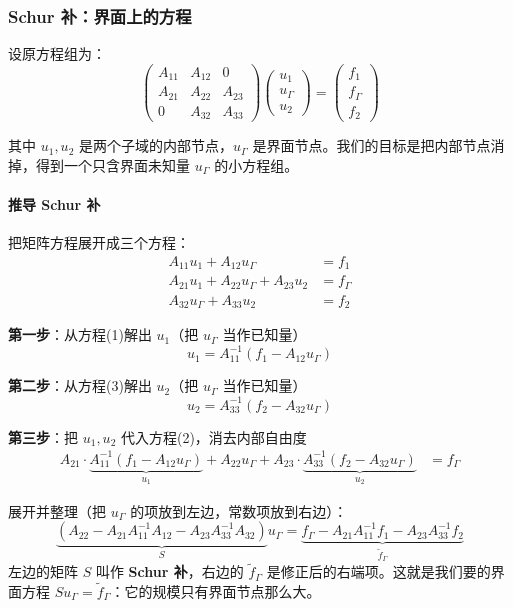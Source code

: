 \subsubsection*{Schur 补：界面上的方程}

设原方程组为：
\[
\begin{pmatrix}
A_{11} & A_{12} & 0 \\
A_{21} & A_{22} & A_{23} \\
0 & A_{32} & A_{33}
\end{pmatrix}
\begin{pmatrix}
u_1 \\ u_\Gamma \\ u_2
\end{pmatrix}
=
\begin{pmatrix}
f_1 \\ f_\Gamma \\ f_2
\end{pmatrix}
\]

其中 $u_1, u_2$ 是两个子域的内部节点，$u_\Gamma$ 是界面节点。我们的目标是把内部节点消掉，得到一个只含界面未知量 $u_\Gamma$ 的小方程组。

\paragraph{推导 Schur 补}

把矩阵方程展开成三个方程：
\begin{align}
A_{11} u_1 + A_{12} u_\Gamma &= f_1 \tag{子域1内部} \\
A_{21} u_1 + A_{22} u_\Gamma + A_{23} u_2 &= f_\Gamma \tag{界面} \\
A_{32} u_\Gamma + A_{33} u_2 &= f_2 \tag{子域2内部}
\end{align}

\textbf{第一步}：从方程(1)解出 $u_1$（把 $u_\Gamma$ 当作已知量）
\[
u_1 = A_{11}^{-1}(f_1 - A_{12} u_\Gamma)
\]

\textbf{第二步}：从方程(3)解出 $u_2$（把 $u_\Gamma$ 当作已知量）
\[
u_2 = A_{33}^{-1}(f_2 - A_{32} u_\Gamma)
\]

\textbf{第三步}：把 $u_1, u_2$ 代入方程(2)，消去内部自由度
\begin{align*}
A_{21} \cdot \underbrace{A_{11}^{-1}(f_1 - A_{12} u_\Gamma)}_{u_1} + A_{22} u_\Gamma + A_{23} \cdot \underbrace{A_{33}^{-1}(f_2 - A_{32} u_\Gamma)}_{u_2} &= f_\Gamma
\end{align*}

展开并整理（把 $u_\Gamma$ 的项放到左边，常数项放到右边）：
\begin{equation}
\underbrace{\left(A_{22} - A_{21}A_{11}^{-1}A_{12} - A_{23}A_{33}^{-1}A_{32}\right)}_{S} u_\Gamma = \underbrace{f_\Gamma - A_{21}A_{11}^{-1}f_1 - A_{23}A_{33}^{-1}f_2}_{\tilde{f}_\Gamma}
\end{equation}
左边的矩阵 $S$ 叫作 \textbf{Schur 补}，右边的 $\tilde{f}_\Gamma$ 是修正后的右端项。这就是我们要的界面方程 $S u_\Gamma = \tilde{f}_\Gamma$：它的规模只有界面节点那么大。


